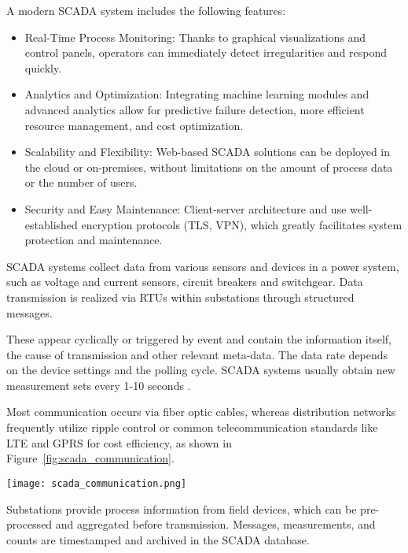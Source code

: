 A modern SCADA system includes the following features:  
\begin{itemize}
    \item Real-Time Process Monitoring: Thanks to graphical visualizations and control panels, operators can immediately detect irregularities and respond quickly.
    \item Analytics and Optimization: Integrating machine learning modules and advanced analytics allow for predictive failure detection, more efficient resource management, and cost optimization.
    \item Scalability and Flexibility: Web-based SCADA solutions can be deployed in the cloud or on-premises, without limitations on the amount of process data or the number of users.
    \item Security and Easy Maintenance: Client-server architecture and use well-established encryption protocols (TLS, VPN), which greatly facilitates system protection and maintenance.
\end{itemize}

SCADA systems collect data from various sensors and devices in a power system, such as voltage and current sensors, circuit breakers and switchgear. Data transmission is realized via RTUs within substations through structured messages. 

These appear cyclically or triggered by event and contain the information itself, the cause of transmission and other relevant meta-data. The data rate depends on the device settings and the polling cycle. SCADA systems usually obtain new measurement sets every 1-10 seconds \autocite{1338122}.

Most communication occurs via fiber optic cables, whereas distribution networks frequently utilize ripple control or common telecommunication standards like LTE and GPRS for cost efficiency, as shown in Figure~\cref{fig:scada_communication}.

\begin{figure*}[htbp]
    \centering
    \texttt{[image: scada\_communication.png]}
    \caption{SCADA System general layout communication system \autocite{nist_sp800_82}.}
    \label{fig:scada_communication}
\end{figure*}

Substations provide process information from field devices, which can be pre-processed and aggregated before transmission. Messages, measurements, and counts are timestamped and archived in the SCADA database. 

